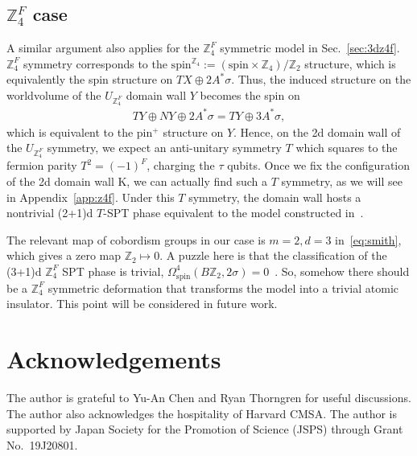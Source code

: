 \documentclass[12pt]{article}
\numberwithin{equation}{section}
\begin{document}
\subsection{$\mathbb{Z}_4^F$ case}
A similar argument also applies for the $\mathbb{Z}_4^F$ symmetric model in Sec.~\ref{sec:3dz4f}. $\mathbb{Z}_4^F$ symmetry corresponds to the $\mathrm{spin}^{\mathbb{Z}_4}:=(\mathrm{spin}\times\mathbb{Z}_4)/\mathbb{Z}_2$ structure, which is equivalently the spin structure on $TX\oplus 2A^*\sigma$. Thus, the induced structure on the worldvolume of the $U_{\mathbb{Z}_4^F}$ domain wall $Y$ becomes the spin on
\begin{align}
    TY\oplus NY\oplus 2A^*\sigma = TY\oplus 3A^*\sigma,
    \label{eq:Ystructure23}
\end{align}
which is equivalent to the pin$^+$ structure on $Y$. Hence, on the 2d domain wall of the $U_{\mathbb{Z}_4^F}$ symmetry, we expect an anti-unitary symmetry $T$ which squares to the fermion parity $T^2=(-1)^F$, charging the $\tau$ qubits. Once we fix the configuration of the 2d domain wall $\mathrm{K}$, we can actually find such a $T$ symmetry, as we will see in Appendix~\ref{app:z4f}.
Under this $T$ symmetry, the domain wall hosts a nontrivial (2+1)d $T$-SPT phase equivalent to the model constructed in~\cite{Zitao}. 

The relevant map of cobordism groups in our case is $m=2, d=3$ in~\eqref{eq:smith}, which gives a zero map $\mathbb{Z}_2\mapsto 0$. A puzzle here is that the classification of the (3+1)d $\mathbb{Z}_4^F$ SPT phase is trivial, $\Omega_{\mathrm{spin}}^4(B\mathbb{Z}_2, 2\sigma)=0$~\cite{Garcia-Etxebarria:2018}. So, somehow there should be a $\mathbb{Z}_4^F$ symmetric deformation that transforms the model into a trivial atomic insulator. This point will be considered in future work.

\section*{Acknowledgements}
The author is grateful to Yu-An Chen and Ryan Thorngren for useful discussions.
The author also acknowledges the hospitality of Harvard CMSA.
The author is supported by Japan Society for the Promotion of Science (JSPS) through Grant No.~19J20801. 

\appendix
\end{document}
